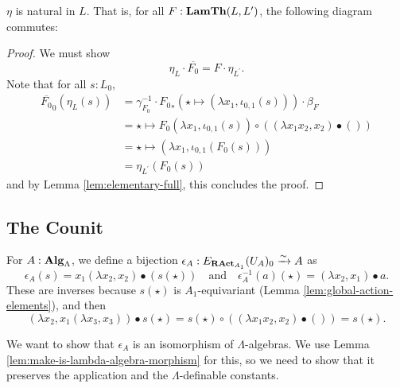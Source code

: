\begin{lemma}
  $ \eta $ is natural in $ L $. That is, for all $ F: \mathbf{LamTh}(L, L^\prime) $, the following diagram commutes:
  \begin{center}
  \end{center}
\end{lemma}
\begin{proof}
  We must show
  \[ \eta_L \cdot \overline{F_0} = F \cdot \eta_{L^\prime}. \]
  Note that for all $ s : L_0 $,
  \begin{align*}
    \overline{F_0}_0(\eta_L(s))
    &= \gamma_{F_0}^{-1} \cdot {F_0}_*(\star \mapsto (\lambda x_1, \iota_{0, 1}(s))) \cdot \beta_F\\
    &= \star \mapsto F_0(\lambda x_1, \iota_{0, 1}(s)) \circ ((\lambda x_1 x_2, x_2) \bullet ())\\
    &= \star \mapsto (\lambda x_1, \iota_{0, 1}(F_0(s)))\\
    &= \eta_{L^\prime}(F_0(s))
  \end{align*}
  and by Lemma \ref{lem:elementary-full}, this concludes the proof.
\end{proof}

\subsection{The Counit}

\begin{definition}
  For $ A : \mathbf{Alg}_{\Lambda} $, we define a bijection $ \epsilon_A : E_{\mathbf{RAct}_{A_1}}(U_A)_0 \xrightarrow \sim A $ as
  \[ \epsilon_A(s) = x_1 (\lambda x_2, x_2) \bullet (s(\star)) \quad \text{and} \quad \epsilon_A^{-1}(a)(\star) = (\lambda x_2, x_1) \bullet a. \]
  These are inverses because $ s(\star) $ is $ A_1 $-equivariant (Lemma \ref{lem:global-action-elements}), and then
  \[ (\lambda x_2, x_1 (\lambda x_3, x_3)) \bullet s(\star) = s(\star) \circ ((\lambda x_1 x_2, x_2) \bullet ()) = s(\star). \]
\end{definition}

We want to show that $ \epsilon_A $ is an isomorphism of $ \Lambda $-algebras. We use Lemma \ref{lem:make-is-lambda-algebra-morphism} for this, so we need to show that it preserves the application and the $ \Lambda $-definable constants.

